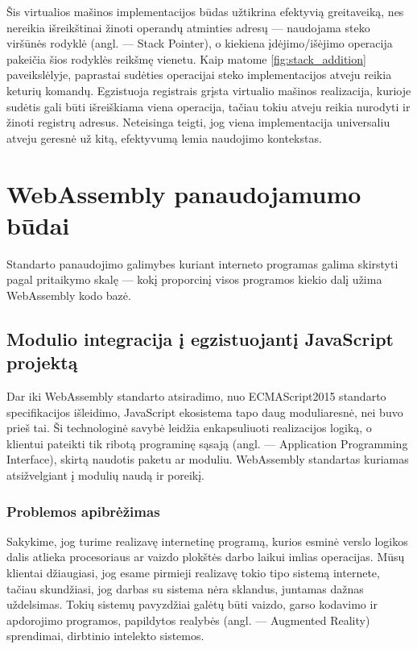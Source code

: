 \documentclass{VUMIFPSkursinis}
\begin{document}
Šis virtualios mašinos implementacijos būdas užtikrina efektyvią greitaveiką, nes nereikia išreikštinai žinoti operandų atminties adresų — naudojama steko viršūnės rodyklė (angl. — Stack Pointer), o kiekiena įdėjimo/išėjimo operacija pakeičia šios rodyklės reikšmę vienetu.
Kaip matome \ref{fig:stack_addition} paveikslėlyje, paprastai sudėties operacijai steko implementacijos atveju reikia keturių komandų. Egzistuoja registrais grįsta virtualio mašinos realizacija, kurioje sudėtis gali būti išreiškiama viena operacija, tačiau tokiu atveju reikia nurodyti ir žinoti registrų adresus. Neteisinga teigti, jog viena implementacija universaliu atveju geresnė už kitą, efektyvumą lemia naudojimo kontekstas.

\section{WebAssembly panaudojamumo būdai}
Standarto panaudojimo galimybes kuriant interneto programas galima skirstyti pagal pritaikymo skalę — kokį proporcinį visos programos kiekio dalį užima WebAssembly kodo bazė.

\subsection{Modulio integracija į egzistuojantį JavaScript projektą}
Dar iki WebAssembly standarto atsiradimo, nuo ECMAScript2015 standarto specifikacijos išleidimo, JavaScript ekosistema tapo daug moduliaresnė, nei buvo prieš tai. Ši technologinė savybė leidžia enkapsuliuoti realizacijos logiką, o klientui pateikti tik ribotą programinę sąsają (angl. — Application Programming Interface), skirtą naudotis paketu ar moduliu. WebAssembly standartas kuriamas atsižvelgiant į modulių naudą ir poreikį.

\subsubsection{Problemos apibrėžimas}
Sakykime, jog turime realizavę internetinę programą, kurios esminė verslo logikos dalis atlieka procesoriaus ar vaizdo plokštės darbo laikui imlias operacijas. Mūsų klientai džiaugiasi, jog esame pirmieji realizavę tokio tipo sistemą internete, tačiau skundžiasi, jog darbas su sistema nėra sklandus, juntamas dažnas uždelsimas. Tokių sistemų pavyzdžiai galėtų būti vaizdo, garso kodavimo ir apdorojimo programos, papildytos realybės (angl. — Augmented Reality) sprendimai, dirbtinio intelekto sistemos. 
\end{document}
